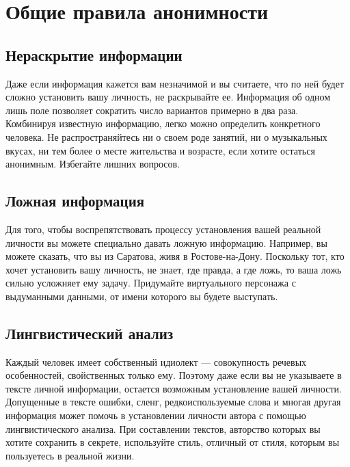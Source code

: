 \chapter{Общие правила анонимности}
\section{Нераскрытие информации}
Даже если информация кажется вам незначимой и вы считаете, что по ней будет сложно установить вашу личность, не раскрывайте ее. Информация об одном лишь поле позволяет сократить число вариантов примерно в два раза. Комбинируя известную информацию, легко можно определить конкретного человека. Не распространяйтесь ни о своем роде занятий, ни о музыкальных вкусах, ни тем более о месте жительства и возрасте, если хотите остаться анонимным. Избегайте лишних вопросов.
\section{Ложная информация}
Для того, чтобы воспрепятствовать процессу установления вашей реальной личности вы можете специально давать ложную информацию. Например, вы можете сказать, что вы из Саратова, живя в Ростове-на-Дону. Поскольку тот, кто хочет установить вашу личность, не знает, где правда, а где ложь, то ваша ложь сильно усложняет ему задачу. Придумайте виртуального персонажа с выдуманными данными, от имени которого вы будете выступать.
\section{Лингвистический анализ}
Каждый человек имеет собственный идиолект --- совокупность речевых особенностей, свойственных только ему. Поэтому даже если вы не указываете в тексте личной информации, остается возможным установление вашей личности. Допущенные в тексте ошибки, сленг, редкоиспользуемые слова и многая другая информация может помочь в установлении личности автора с помощью лингвистического анализа. При составлении текстов, авторство которых вы хотите сохранить в секрете, используйте стиль, отличный от стиля, которым вы пользуетесь в реальной жизни.

